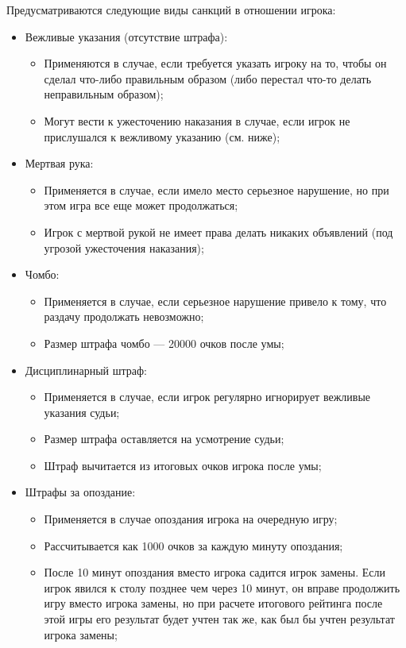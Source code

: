 Предусматриваются следующие виды санкций в отношении игрока:
\begin{itemize}
	\item Вежливые указания (отсутствие штрафа):
	\begin{itemize}
		\item Применяются в случае, если требуется указать игроку на то, чтобы он сделал что-либо правильным образом (либо перестал что-то делать неправильным образом);
		\item Могут вести к ужесточению наказания в случае, если игрок не прислушался к вежливому указанию (см. ниже);
	\end{itemize}
	\item Мертвая рука:
	\begin{itemize}
		\item Применяется в случае, если имело место серьезное нарушение, но при этом игра все еще может продолжаться;
		\item Игрок с мертвой рукой не имеет права делать никаких объявлений (под угрозой ужесточения наказания);
	\end{itemize}
	\item Чомбо:
	\begin{itemize}
		\item Применяется в случае, если серьезное нарушение привело к тому, что раздачу продолжать невозможно;
		\item Размер штрафа чомбо --- 20000 очков после умы;
	\end{itemize}
	\item Дисциплинарный штраф:
	\begin{itemize}
		\item Применяется в случае, если игрок регулярно игнорирует вежливые указания судьи;
		\item Размер штрафа оставляется на усмотрение судьи;
		\item Штраф вычитается из итоговых очков игрока после умы;
	\end{itemize}
	\item Штрафы за опоздание:
	\begin{itemize}
		\item Применяется в случае опоздания игрока на очередную игру;
		\item Рассчитывается как 1000 очков за каждую минуту опоздания;
		\item После 10 минут опоздания вместо игрока садится игрок замены. Если игрок явился к столу позднее чем через 10 минут, он вправе продолжить игру вместо игрока замены, но при расчете итогового рейтинга после этой игры его результат будет учтен так же, как был бы учтен результат игрока замены;

\end{itemize}
\end{itemize}
